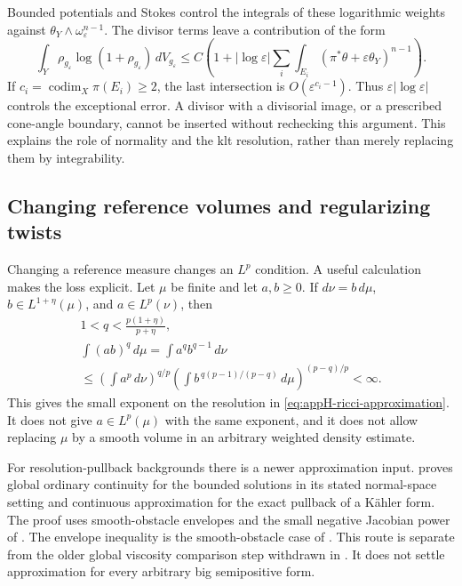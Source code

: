 Bounded potentials and Stokes control the integrals of these
logarithmic weights against
\(\theta_Y\wedge\omega_\varepsilon^{n-1}\).
The divisor terms leave a contribution of the form
\[
 \int_Y\rho_{g_\varepsilon}
           \log(1+\rho_{g_\varepsilon})\,dV_{g_\varepsilon}
 \leq C\left(1+|\log\varepsilon|
           \sum_i\int_{E_i}
             (\pi^*\theta+\varepsilon\theta_Y)^{n-1}\right).
 \tag{H.166}\label{eq:appH-ricci-exceptional-entropy}
\]
If \(c_i=\operatorname{codim}_X\pi(E_i)\geq2\), the last
intersection is \(O(\varepsilon^{c_i-1})\).
Thus \(\varepsilon|\log\varepsilon|\) controls the exceptional
error. A divisor with a divisorial image, or a prescribed
cone-angle boundary, cannot be inserted without rechecking this
argument. This explains the role of normality and the klt
resolution, rather than merely replacing them by integrability.

\subsection{Changing reference volumes and regularizing twists}

Changing a reference measure changes an \(L^p\) condition.
A useful calculation makes the loss explicit. Let \(\mu\) be finite and let \(a,b\geq0\).
If \(d\nu=b\,d\mu\), \(b\in L^{1+\eta}(\mu)\), and
\(a\in L^p(\nu)\), then
\[
 \begin{gathered}
 1<q<\frac{p(1+\eta)}{p+\eta},\\
 \int (ab)^q\,d\mu
       =\int a^q b^{q-1}\,d\nu\\
 \leq
   \left(\int a^p\,d\nu\right)^{q/p}
   \left(\int b^{\,q(p-1)/(p-q)}\,d\mu
                                      \right)^{(p-q)/p}<\infty .
 \end{gathered}
 \tag{H.167}\label{eq:appH-ricci-reference-conversion}
\]
This gives the small exponent on the resolution in
\eqref{eq:appH-ricci-approximation}. It does not give
\(a\in L^p(\mu)\) with the same exponent, and it does not
allow replacing \(\mu\) by a smooth volume in an arbitrary
weighted density estimate.

For resolution-pullback backgrounds there is a newer
approximation input.
\cite[Theorems~4.2 and~5.5]{ChoChoi25ContinuityV2}
proves global ordinary continuity for the bounded solutions
in its stated normal-space setting and continuous approximation
for the exact pullback of a Kähler form. The proof uses
smooth-obstacle envelopes and the small negative Jacobian
power of \cite[Lemma~3.2]{EGZ08SingularKEV2}.
The envelope inequality is the smooth-obstacle case of
\cite[Theorem~3.5]{GLZ17EnvelopesV1}.
This route is separate from the older global viscosity
comparison step withdrawn in \cite{EGZ16ViscosityErratumV1}.
It does not settle approximation for every arbitrary big
semipositive form.

